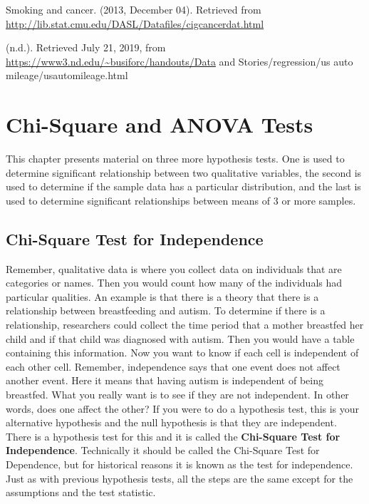 \documentclass[
]{book}
\begin{document}
Smoking and cancer. (2013, December 04). Retrieved from
\url{http://lib.stat.cmu.edu/DASL/Datafiles/cigcancerdat.html}

(n.d.). Retrieved July 21, 2019, from \url{https://www3.nd.edu/~busiforc/handouts/Data} and Stories/regression/us auto mileage/usautomileage.html

\hypertarget{chi-square-and-anova-tests}{%
\chapter{Chi-Square and ANOVA Tests}\label{chi-square-and-anova-tests}}

This chapter presents material on three more hypothesis tests. One is used to determine significant relationship between two qualitative variables, the second is used to determine if the sample data has a particular distribution, and the last is used to determine significant relationships between means of 3 or more samples.

\hypertarget{chi-square-test-for-independence}{%
\section{Chi-Square Test for Independence}\label{chi-square-test-for-independence}}

Remember, qualitative data is where you collect data on individuals that are categories or names. Then you would count how many of the individuals had particular qualities. An example is that there is a theory that there is a relationship between breastfeeding and autism. To determine if there is a relationship, researchers could collect the time period that a mother breastfed her child and if that child was diagnosed with autism. Then you would have a table containing this information. Now you want to know if each cell is independent of each other cell. Remember, independence says that one event does not affect another event. Here it means that having autism is independent of being breastfed. What you really want is to see if they are not independent. In other words, does one affect the other? If you were to do a hypothesis test, this is your alternative hypothesis and the null hypothesis is that they are independent. There is a hypothesis test for this and it is called the \textbf{Chi-Square Test for Independence}. Technically it should be called the Chi-Square Test for Dependence, but for historical reasons it is known as the test for independence. Just as with previous hypothesis tests, all the steps are the same except for the assumptions and the test statistic.
\end{document}
